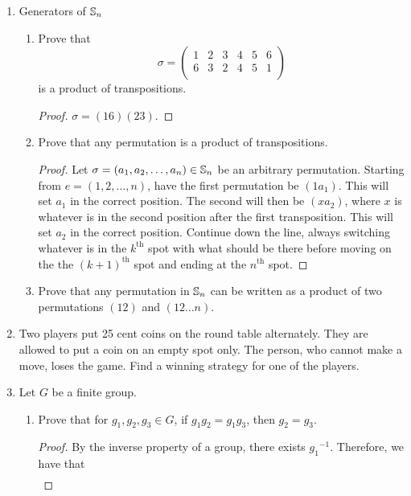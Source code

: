 \documentclass[../main.tex]{subfiles}
\begin{document}
\begin{enumerate}
    \item Generators of $\mathbb{S}_n$
    \begin{enumerate}
        \item Prove that
        \begin{equation*}
            \sigma =
            \begin{pmatrix}
                1 & 2 & 3 & 4 & 5 & 6\\
                6 & 3 & 2 & 4 & 5 & 1\\
            \end{pmatrix}
        \end{equation*}
        is a product of transpositions.
        \begin{proof}
            $\sigma=(16)(23)$.
        \end{proof}
        \item Prove that any permutation is a product of transpositions.
        \begin{proof}
            Let $\sigma=(a_1,a_2,\dots,a_n)\in\mathbb{S}_n$ be an arbitrary permutation. Starting from $e=(1,2,\dots,n)$, have the first permutation be $(1a_1)$. This will set $a_1$ in the correct position. The second will then be $(xa_2)$, where $x$ is whatever is in the second position after the first transposition. This will set $a_2$ in the correct position. Continue down the line, always switching whatever is in the $k^\text{th}$ spot with what should be there before moving on the the $(k+1)^\text{th}$ spot and ending at the $n^\text{th}$ spot.
        \end{proof}
        \item Prove that any permutation in $\mathbb{S}_n$ can be written as a product of two permutations $(12)$ and $(12\dots n)$.
    \end{enumerate}
    \item Two players put 25 cent coins on the round table alternately. They are allowed to put a coin on an empty spot only. The person, who cannot make a move, loses the game. Find a winning strategy for one of the players.
    \item Let $G$ be a finite group.
    \begin{enumerate}
        \item Prove that for $g_1,g_2,g_3\in G$, if $g_1g_2=g_1g_3$, then $g_2=g_3$.
        \begin{proof}
            By the inverse property of a group, there exists ${g_1}^{-1}$. Therefore, we have that
            \begin{align*}

\end{align*}
\end{proof}
\end{enumerate}
\end{enumerate}
\end{document}
